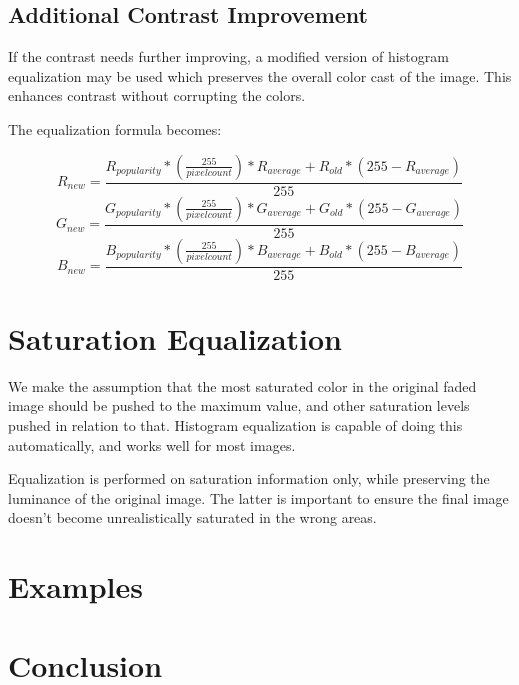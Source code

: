 \documentclass{article}
\begin{document}
\subsection{Additional Contrast Improvement}
If the contrast needs further improving, a modified version of histogram
equalization may be used which preserves the overall color cast of the image.
This enhances contrast without corrupting the colors.

The equalization formula becomes:

\[ R_{new} = \frac{R_{popularity} * (\frac{255}{pixel count}) * R_{average}
                   + R_{old} * (255 - R_{average})}{255} \]
\[ G_{new} = \frac{G_{popularity} * (\frac{255}{pixel count}) * G_{average}
                   + G_{old} * (255 - G_{average})}{255} \]
\[ B_{new} = \frac{B_{popularity} * (\frac{255}{pixel count}) * B_{average}
                   + B_{old} * (255 - B_{average})}{255} \]

\section{Saturation Equalization}
We make the assumption that the most saturated color in the original faded
image should be pushed to the maximum value, and other saturation levels
pushed in relation to that. Histogram equalization is capable of doing this 
automatically, and works well for most images.

Equalization is performed on saturation information only, while
preserving the luminance of the original image. The latter is important to
ensure the final image doesn't become unrealistically saturated in the wrong areas.

\section{Examples}

\section{Conclusion}
\end{document}
